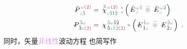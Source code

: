 \begin{subequations} \label{eq:DP^(2)-3_12-spectrum}
\begin{align}
	\Xint{\mathcolor{gray}{-}}{30}{\bar{P}}^{\;\! \mathcolor{gray}{\omega} \textcolor{Maroon}{(2)} }_{\;\! \mathcolor{gray}{z} \textcolor{PineGreen}{\hat{3}}} &= \Xint{{}^{}_{\mathcolor{gray}{-}}}{23}{\bar{\bar{\bar{\chi}}}}^{\;\! \mathcolor{gray}{\omega} \textcolor{Maroon}{(2)}}_{\mathcolor{gray}{z} \textcolor{PineGreen}{\hat{3} \hat{1} \hat{2}} } ~{}^{\mathcolor{gray}{*}}_{\mathcolor{gray}{*}} \left( \Xint{\mathcolor{gray}{-}}{295}{\bar{E}}^{\;\! \mathcolor{gray}{\omega} \textcolor{PineGreen}{\hat{1}} }_{\;\! \mathcolor{gray}{z} } ~\mathcolor{gray}{\widetilde \circledast}~ \Xint{\mathcolor{gray}{-}}{295}{\bar{E}}^{\;\! \mathcolor{gray}{\omega} \textcolor{PineGreen}{\hat{2}} }_{\;\! \mathcolor{gray}{z} } \right) \label{eq:vec-DP^(2)-3_12-spectrum} \\
	\Xint{\mathcolor{gray}{-}}{30}{P}^{\;\! \textcolor{PineGreen}{\hat{3}} \mathcolor{gray}{\omega} }_{\;\! \hat{3}\mathcolor{gray}{z} \textcolor{Maroon}{(2)} } &= \Xint{{}^{}_{\mathcolor{gray}{-}}}{23}{\chi}^{\;\! \textcolor{PineGreen}{\hat{3}} \mathcolor{gray}{\omega} \hat{1} \hat{2} }_{\;\! \hat{3} \mathcolor{gray}{z} \textcolor{PineGreen}{\hat{1} \hat{2}} \textcolor{Maroon}{(2)}} \mathcolor{gray}{*} \left( \Xint{\mathcolor{gray}{-}}{295}{E}^{\;\! \textcolor{PineGreen}{\hat{1}} \mathcolor{gray}{\omega} }_{\;\! \hat{1} \mathcolor{gray}{z}} ~\mathcolor{gray}{\widetilde \circledast}~ \Xint{\mathcolor{gray}{-}}{295}{E}^{\;\! \textcolor{PineGreen}{\hat{2}} \mathcolor{gray}{\omega} }_{\;\! \hat{2} \mathcolor{gray}{z}} \right) ~. \label{eq:components-DP^(2)-3_12-spectrum}
\end{align}
\end{subequations}
同时，矢量\textcolor{Plum}{非线性}波动方程  也简写作
